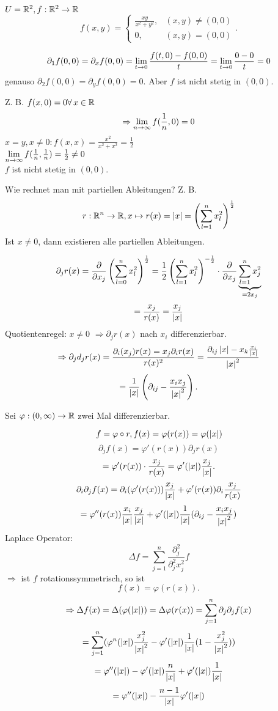 \documentclass[../ana2.tex]{subfiles}
\begin{document}
\begin{bsp}
    \( U = \mathbb{R}^2, f:\mathbb{R}^2\rightarrow \mathbb{R} \)
    \[ f(x,y) = \begin{cases}
        \frac{xy}{x^2 + y^2}, &(x,y) \neq (0,0)\\
        0, &(x,y) = (0,0)
    \end{cases}. \]

    \[ \partial_1 f(0,0) = \partial_x f(0,0) 
    = \lim\limits_{t\rightarrow{}0} \frac{f(t,0) - f(0,0)}{t} 
    = \lim\limits_{t\rightarrow{}0} \frac{0 - 0}{t} = 0 \]
    genauso \( \partial_2 f(0,0) = \partial_y f(0,0) = 0 \).
    Aber \(f\) ist nicht stetig in \( (0,0) \).

    Z. B. \( f(x,0) = 0 \forall x \in \R \)
    \[ \Rightarrow \lim\limits_{n\rightarrow\infty} f(\frac{1}{n},0) = 0 \]
    \( x=y, x \neq 0: f(x,x) = \frac{x^2}{x^2 + x^2} = \frac{1}{2} \) \\
    \( \lim\limits_{n\rightarrow\infty} f(\frac{1}{n}, \frac{1}{n}) = \frac{1}{2} \neq 0 \) \\
    \( f \) ist nicht stetig in \( (0,0) \).
\end{bsp}
Wie rechnet man mit partiellen Ableitungen?
Z. B. \[ r:\mathbb{R}^n\rightarrow \mathbb{R}, x \mapsto r(x) = \left|x\right| 
= \left( \sum_{l=1}^n x_l^2 \right)^{\frac{1}{2}} \]
Ist \( x \neq 0 \), dann existieren alle partiellen Ableitungen.

\[ \partial_j r(x) = \frac{\partial}{\partial x_j} 
\left( \sum_{l=0}^n x_l^2 \right)^{\frac{1}{2}} 
= \frac{1}{2} \left( \sum_{l=1}^n x_l^2 \right)^{-\frac{1}{2}} 
\cdot \frac{\partial}{\partial x_j} \underbrace{\sum_{l=1}^n x_j^2}_{=2x_j} \]
\[ = \frac{x_j}{r(x)} = \frac{x_j}{\left|x\right|} \]
Quotientenregel: \( x \neq 0 \)
\( \Rightarrow \partial_j r(x) \) nach \( x_i \) 
differenzierbar.
\[ \Rightarrow \partial_j d_j r(x) 
= \frac{ \partial_i(x_j) r(x) = x_j \partial_i r(x) }{r(x)^2} 
= \frac{\partial_{ij} \left|x\right| - x_k \frac{x_i}{\left|x\right|}}{\left|x\right|^2} \]
\[ = \frac{1}{\left|x\right|} \left( \partial_{ij} - \frac{x_i x_j}{\left|x\right|^2} \right). \]

Sei \( \varphi:(0,\infty)\rightarrow \mathbb{R} \) zwei Mal differenzierbar. 

\[ f = \varphi \circ r, f(x) = \varphi(r(x)) = \varphi(\left|x\right|) \]
\[ \partial_j f(x) = \varphi'(r(x)) \partial_j r(x) \]
\[ = \varphi'(r(x)) \cdot \frac{x_j}{r(x)} 
= \varphi'(\left|x\right|) \frac{x_j}{\left|x\right|}. \]
\[ \partial_i \partial_j f(x) = \partial_i(\varphi'(r(x))) 
\frac{x_j}{\left|x\right|} + \varphi'(r(x)) \partial_i \frac{x_j}{r(x)} \]
\[ = \varphi''(r(x)) \frac{x_i}{\left|x\right|} \frac{x_j}{\left|x\right|} 
+ \varphi'(\left|x\right|) \frac{1}{\left|x\right|} (\partial_{ij} - \frac{x_i x_j}{\left|x\right|^2}) \]
Laplace Operator:
\[ \Delta f = \sum_{j=1}^n \frac{\partial_j^2}{\partial_j^2 x_j^2} f \]
\( \Rightarrow \) ist \(f\) rotationssymmetrisch, so ist 
\[ f(x) = \varphi(r(x)). \]
\[ \Rightarrow \Delta f(x) = \Delta(\varphi(\left|x\right|)) 
= \Delta \varphi(r(x)) = \sum_{j=1}^n 
\partial_j \partial_j f(x) \]
\[ = \sum_{j=1}^n (\varphi^n(\left|x\right|) \frac{x_j^2}{\left|x\right|^2} 
- \varphi'(\left|x\right|) \frac{1}{\left|x\right|} (1 - \frac{x_j^2}{\left|x\right|^2}) ) \]
\[ = \varphi''(\left|x\right|) - \varphi'(\left|x\right|) \frac{n}{\left|x\right|} 
+ \varphi'(\left|x\right|) \frac{1}{\left|x\right|} \]
\[ = \varphi''(\left|x\right|) - \frac{n-1}{\left|x\right|} \varphi'(\left|x\right|) \]
\end{document}
